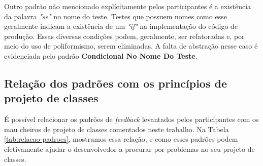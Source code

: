 \documentclass[conference]{IEEEtran}
\begin{document}
Outro padrão não mencionado explícitamente pelos participantes 
é a existência da palavra \textit{"se"} no nome do teste. Testes que
possuem nomes como esse geralmente indicam a existência de um \textit{"if"} na implementação
do código de produção. Essas diversas condições podem, geralmente, ser refatoradas e,
por meio do uso de poliformismo, serem eliminadas. A falta de abstração nesse caso
é evidenciada pelo padrão \textbf{Condicional No Nome Do Teste}.

\subsection{Relação dos padrões com os princípios de projeto de classes}

É possível relacionar os padrões de \textit{feedback} levantados pelos participantes
com os mau cheiros de projeto de classes comentados neste trabalho. 
Na Tabela \ref{tab:relacao-padroes},
mostramos essa relação, e como esses padrões podem efetivamente ajudar o desenvolvedor
a procurar por problemas no seu projeto de classes.
\end{document}
